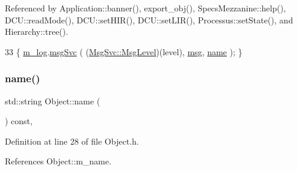 Referenced by Application\+::banner(), export\+\_\+obj(), Specs\+Mezzanine\+::help(), D\+C\+U\+::read\+Mode(), D\+C\+U\+::set\+H\+I\+R(), D\+C\+U\+::set\+L\+I\+R(), Processus\+::set\+State(), and Hierarchy\+::tree().


\begin{DoxyCode}
33 \{ \hyperlink{classObject_a0d269813dd7ac1f24bc143031e2963f2}{m\_log}.\hyperlink{classMsgSvc_ad25f18047920cc59a314e5098259711c}{msgSvc} ( (\hyperlink{classMsgSvc_ae671eb7301996cd049d2da8a65925926}{MsgSvc::MsgLevel})(level), \hyperlink{classObject_a58b2d0618c2d08cf2383012611528d97}{msg}, 
      \hyperlink{classObject_a300f4c05dd468c7bb8b3c968868443c1}{name} ); \}
\end{DoxyCode}
\mbox{\label{classObject_a300f4c05dd468c7bb8b3c968868443c1}} 
\subsubsection{\texorpdfstring{name()}{name()}}
{\footnotesize\ttfamily std\+::string Object\+::name (\begin{DoxyParamCaption}{ }\end{DoxyParamCaption}) const\hspace{0.3cm}{\ttfamily [inline]}, {\ttfamily [inherited]}}



Definition at line 28 of file Object.\+h.



References Object\+::m\+\_\+name.



